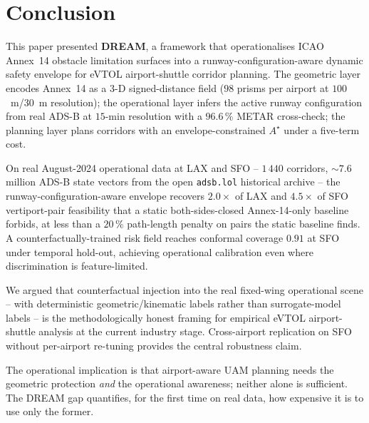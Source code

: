 \section{Conclusion}
\label{sec:conclusion}

This paper presented \textbf{DREAM}, a framework that operationalises ICAO
Annex~14 obstacle limitation surfaces into a runway-configuration-aware
dynamic safety envelope for eVTOL airport-shuttle corridor planning. The
geometric layer encodes Annex~14 as a 3-D signed-distance field
($98$ prisms per airport at $100$~m/$30$~m resolution); the operational
layer infers the active runway configuration from real ADS-B at $15$-min
resolution with a $96.6\,\%$ METAR cross-check; the planning layer plans
corridors with an envelope-constrained $A^\star$ under a five-term cost.

On real August-2024 operational data at LAX and SFO -- $1\,440$ corridors,
$\sim7.6$ million ADS-B state vectors from the open
\texttt{adsb.lol} historical archive -- the runway-configuration-aware
envelope recovers $\boldsymbol{2.0\times}$ of LAX and
$\boldsymbol{4.5\times}$ of SFO vertiport-pair feasibility that a static
both-sides-closed Annex-14-only baseline forbids, at less than a $20\,\%$
path-length penalty on pairs the static baseline finds. A
counterfactually-trained risk field reaches conformal coverage $0.91$ at
SFO under temporal hold-out, achieving operational calibration even where
discrimination is feature-limited.

We argued that counterfactual injection into the real fixed-wing
operational scene -- with deterministic geometric/kinematic labels rather
than surrogate-model labels -- is the methodologically honest framing for
empirical eVTOL airport-shuttle analysis at the current industry stage.
Cross-airport replication on SFO without per-airport re-tuning provides
the central robustness claim.

The operational implication is that airport-aware UAM planning needs the
geometric protection \emph{and} the operational awareness; neither alone is
sufficient. The DREAM gap quantifies, for the first time on real data, how
expensive it is to use only the former.
